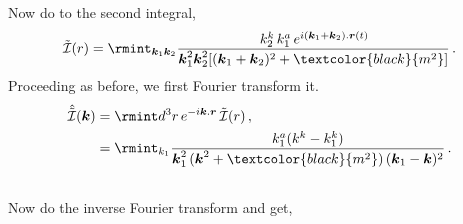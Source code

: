 Now do to the second integral,
\begin{equation}
    \Tilde{\mathcal{I}}(r)=\rmint_{\boldsymbol{k}_1\boldsymbol{k}_2}\frac{\,k_2^k\, k_1^a\,e^{i(\boldsymbol{k}_1+\boldsymbol{k}_2).\boldsymbol{r}(t)}}{\boldsymbol{k}_1^2\boldsymbol{k}_2^2[(\boldsymbol{k}_1+\boldsymbol{k}_2)^2+\textcolor{black}{m^2}]}\,.
\end{equation}
Proceeding as before, we first Fourier transform it.
\begin{align}
    \begin{split}
        \hat{\Tilde{\mathcal{I}}}(\boldsymbol{k})&=\rmint d^3 r\, e^{-i\boldsymbol{k}.\boldsymbol{r}}\, \Tilde{\mathcal{I}}(r)\,,\\ &
        =\rmint_{k_1}\frac{k_1^a(k^k-k_1^k)}{\boldsymbol{k}_1^2\,(\boldsymbol{k}^2+\textcolor{black}{m^2})\,(\boldsymbol{k}_1-\boldsymbol{k})^2}\,.\\ &
    \end{split}
\end{align}
Now do the inverse Fourier transform and get,

